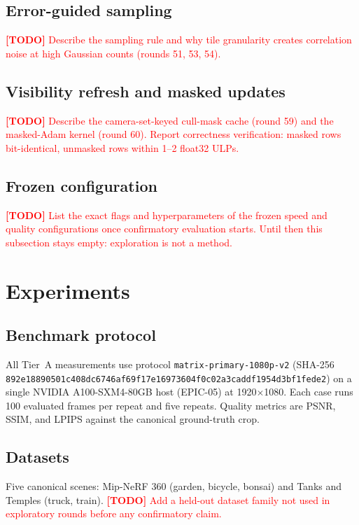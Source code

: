 \documentclass[11pt,letterpaper]{article}
\newcommand{\TODO}[1]{\textcolor{red}{\textbf{[TODO] }#1}}
\begin{document}
\subsection{Error-guided sampling}

\TODO{Describe the sampling rule and why tile granularity creates correlation
noise at high Gaussian counts (rounds 51, 53, 54).}

\subsection{Visibility refresh and masked updates}

\TODO{Describe the camera-set-keyed cull-mask cache (round 59) and the
masked-Adam kernel (round 60). Report correctness verification: masked rows
bit-identical, unmasked rows within 1--2 float32 ULPs.}

\subsection{Frozen configuration}

\TODO{List the exact flags and hyperparameters of the frozen speed and
quality configurations once confirmatory evaluation starts. Until then this
subsection stays empty: exploration is not a method.}

\section{Experiments}

\label{sec:experiments}

\subsection{Benchmark protocol}

All Tier~A measurements use protocol
\texttt{matrix-primary-1080p-v2}
(SHA-256 \texttt{892e18890501c408dc6746af69f17e16973604f0c02a3caddf1954d3bf1fede2})
on a single NVIDIA A100-SXM4-80GB host (EPIC-05) at 1920$\times$1080.
Each case runs 100 evaluated frames per repeat and five repeats. Quality
metrics are PSNR, SSIM, and LPIPS against the canonical ground-truth crop.

\subsection{Datasets}

Five canonical scenes: Mip-NeRF 360 (garden, bicycle, bonsai) and
Tanks and Temples (truck, train). \TODO{Add a held-out dataset family not used
in exploratory rounds before any confirmatory claim.}
\end{document}
